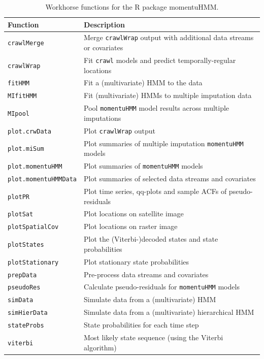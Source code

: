 \documentclass[12pt]{article}\usepackage[]{graphicx}\usepackage[]{color}
\begin{document}
\begin{table}
  \caption{\label{tab:functions} Workhorse functions for the R package momentuHMM.}
  \begin{tabular}{ll}
  \toprule
  Function & Description \tabularnewline
  \midrule
  \verb|crawlMerge| & Merge \verb|crawlWrap| output with additional data streams or covariates  \tabularnewline 
  \verb|crawlWrap| & Fit \verb|crawl| models and predict temporally-regular locations  \tabularnewline  
  \verb|fitHMM| & Fit a (multivariate) HMM to the data  \tabularnewline  
  \verb|MIfitHMM| & Fit (multivariate) HMMs to multiple imputation data  \tabularnewline  
  \verb|MIpool| & Pool \verb|momentuHMM| model results across multiple imputations  \tabularnewline 
  \verb|plot.crwData| & Plot \verb|crawlWrap| output \tabularnewline 
  \verb|plot.miSum| & Plot summaries of multiple imputation \verb|momentuHMM| models  \tabularnewline 
  \verb|plot.momentuHMM| & Plot summaries of \verb|momentuHMM| models  \tabularnewline 
  \verb|plot.momentuHMMData| & Plot summaries of selected data streams and covariates  \tabularnewline 
  \verb|plotPR| & Plot time series, qq-plots and sample ACFs of pseudo-residuals \tabularnewline 
  \verb|plotSat| & Plot locations on satellite image \tabularnewline   
  \verb|plotSpatialCov| & Plot locations on raster image \tabularnewline   
  \verb|plotStates| & Plot the (Viterbi-)decoded states and state probabilities \tabularnewline 
  \verb|plotStationary| & Plot stationary state probabilities \tabularnewline
  \verb|prepData| & Pre-process data streams and covariates \tabularnewline 
  \verb|pseudoRes| & Calculate pseudo-residuals for \verb|momentuHMM| models \tabularnewline 
  \verb|simData| & Simulate data from a (multivariate) HMM \tabularnewline 
  \verb|simHierData| & Simulate data from a (multivariate) hierarchical HMM \tabularnewline 
  \verb|stateProbs| & State probabilities for each time step \tabularnewline 
  \verb|viterbi| & Most likely state sequence (using the Viterbi algorithm)  \tabularnewline  
  \bottomrule
  \end{tabular}
\end{table}
\end{document}
